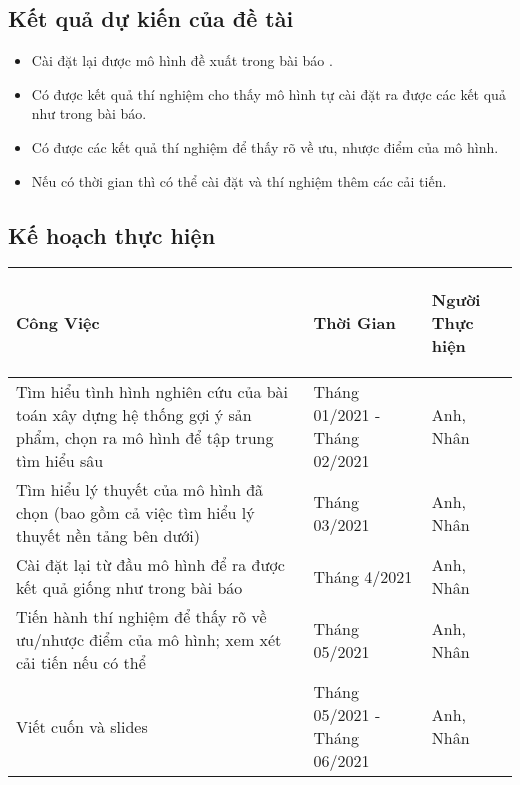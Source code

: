 \documentclass{article}[14pt]
\begin{document}
{    
    
    \subsection{Kết quả dự kiến của đề tài}
        
    \begin{itemize}
        \item Cài đặt lại được mô hình đề xuất trong bài báo \cite{mvae}.
        \item Có được kết quả thí nghiệm cho thấy mô hình tự cài đặt ra được 
các kết quả như trong bài báo.
        \item Có được các kết quả thí nghiệm để thấy rõ về ưu, nhược điểm 
của mô hình.
        \item Nếu có thời gian thì có thể cài đặt và thí nghiệm thêm các cải 
tiến.
    \end{itemize}
    
    \subsection{Kế hoạch thực hiện}
    \begin{tabular}{ | m{20em} | m{4cm}| m{4cm} | } 

        \hline
         \centering\textbf { Công Việc} &  \centering\textbf{Thời Gian}  & 
      \begin{center}
              \textbf{Người Thực hiện}   \end{center} \\ 
        \hline
        Tìm hiểu tình hình nghiên cứu của bài toán xây dựng hệ thống gợi ý sản 
      phẩm, chọn ra mô hình để tập trung tìm hiểu sâu & Tháng 01/2021 - Tháng 
      02/2021 & Anh, Nhân \\ 
        \hline
        Tìm hiểu lý thuyết của mô hình đã chọn (bao gồm cả việc tìm hiểu lý thuyết 
      nền tảng bên dưới) &  Tháng 03/2021 & Anh, Nhân \\ 
        \hline
        Cài đặt lại từ đầu mô hình để ra được kết quả giống như trong bài báo &  
      Tháng 4/2021 & Anh, Nhân \\
        \hline
        Tiến hành thí nghiệm để thấy rõ về ưu/nhược điểm của mô hình; xem xét cải 
      tiến nếu có thể &  Tháng 05/2021 & Anh, Nhân \\
        \hline
       Viết cuốn và slides &  Tháng 05/2021 - Tháng 06/2021 & Anh, Nhân \\
       \hline
      \end{tabular}
      


   
       
    
    }
    
    
    \nocite{*}
\end{document}
